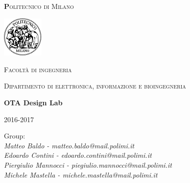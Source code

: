 \begin{titlepage}

	\centering
	{\scshape\huge\textbf Politecnico di Milano \par}
	\vspace{0.5cm}

	\includegraphics[width=0.15\textwidth]{Immagini/logo.png}\par\vspace{0.2cm}
	
	{\scshape\small Facoltà di ingegneria\par}
	{\scshape\small Dipartimento di elettronica, informazione e bioingegneria\par}
	\vspace{1.5cm}
	{\huge\bfseries OTA Design Lab\par}
	\vspace{1.5cm}
	{\scshape \par}
	{\scshape\small 2016-2017 \par}
	\vspace{2cm}
	\vfill
	
	\raggedright
    {Group:\\ \textit{Matteo Baldo - matteo.baldo@mail.polimi.it \\ Edoardo Contini - edoardo.contini@mail.polimi.it \\ Piergiulio Mannocci - piegiulio.mannocci@mail.polimi.it \\ Michele Mastella - michele.mastella@mail.polimi.it}
	
	}\vfill
	
	\end{titlepage}
